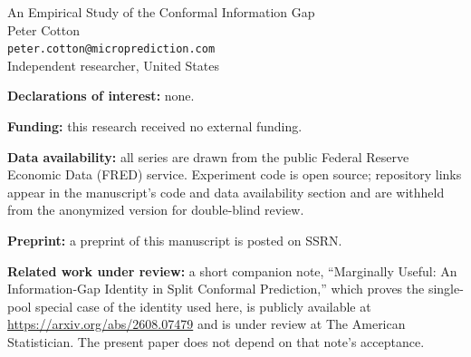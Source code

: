 \documentclass[11pt]{article}
\begin{document}
\begin{center}
{\LARGE An Empirical Study of the Conformal Information Gap}\\[18pt]
{\large Peter Cotton}\\[4pt]
\texttt{peter.cotton@microprediction.com}\\[4pt]
Independent researcher, United States
\end{center}

\vspace{24pt}
\noindent\textbf{Declarations of interest:} none.

\vspace{6pt}
\noindent\textbf{Funding:} this research received no external funding.

\vspace{6pt}
\noindent\textbf{Data availability:} all series are drawn from the public Federal
Reserve Economic Data (FRED) service. Experiment code is open source; repository
links appear in the manuscript's code and data availability section and are
withheld from the anonymized version for double-blind review.

\vspace{6pt}
\noindent\textbf{Preprint:} a preprint of this manuscript is posted on SSRN.

\vspace{6pt}
\noindent\textbf{Related work under review:} a short companion note, ``Marginally
Useful: An Information-Gap Identity in Split Conformal Prediction,'' which
proves the single-pool special case of the identity used here, is publicly available
at \url{https://arxiv.org/abs/2608.07479} and is under review at The American
Statistician. The present paper does not depend on that note's acceptance.
\end{document}
